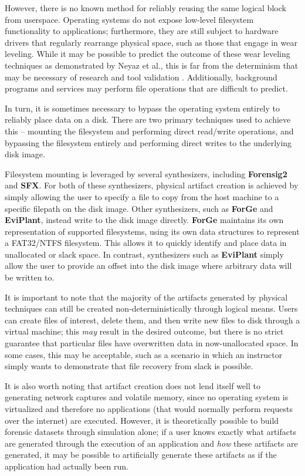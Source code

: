 However, there is no known method for reliably reusing the same logical
block from userspace. Operating systems do not expose low-level
filesystem functionality to applications; furthermore, they are still
subject to hardware drivers that regularly rearrange physical space,
such as those that engage in wear leveling. While it may be possible to
predict the outcome of these wear leveling techniques as demonstrated by
Neyaz et al., this is far from the determinism that may be necessary of
research and tool validation \cite{neyazForensicAnalysisWear2018}.
Additionally, background programs and services may perform file
operations that are difficult to predict.

In turn, it is sometimes necessary to bypass the operating system
entirely to reliably place data on a disk. There are two primary
techniques used to achieve this -- mounting the filesystem and
performing direct read/write operations, and bypassing the filesystem
entirely and performing direct writes to the underlying disk image.

Filesystem mounting is leveraged by several synthesizers, including
\textbf{Forensig2} and \textbf{SFX}. For both of these synthesizers,
physical artifact creation is achieved by simply allowing the user to
specify a file to copy from the host machine to a specific filepath on
the disk image. Other synthesizers, such as \textbf{ForGe} and
\textbf{EviPlant}, instead write to the disk image directly.
\textbf{ForGe} maintains its own representation of supported
filesystems, using its own data structures to represent a FAT32/NTFS
filesystem. This allows it to quickly identify and place data in
unallocated or slack space. In contrast, synthesizers such as
\textbf{EviPlant} simply allow the user to provide an offset into the
disk image where arbitrary data will be written to.

It is important to note that the majority of the artifacts generated by
physical techniques can still be created non-deterministically through
logical means. Users can create files of interest, delete them, and then
write new files to disk through a virtual machine; this \emph{may}
result in the desired outcome, but there is no strict guarantee that
particular files have overwritten data in now-unallocated space. In some
cases, this may be acceptable, such as a scenario in which an instructor
simply wants to demonstrate that file recovery from slack is possible.

It is also worth noting that artifact creation does not lend itself well
to generating network captures and volatile memory, since no operating
system is virtualized and therefore no applications (that would normally
perform requests over the internet) are executed. However, it is
theoretically possible to build forensic datasets through simulation
alone; if a user knows exactly what artifacts are generated through the
execution of an application and \emph{how} these artifacts are
generated, it may be possible to artificially generate these artifacts
as if the application had actually been run.

